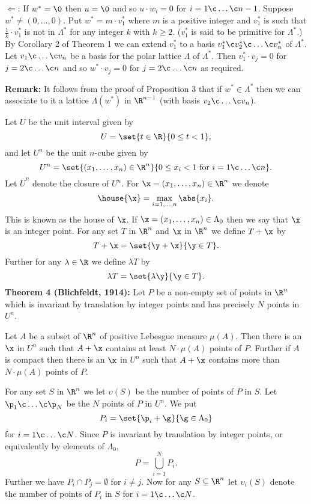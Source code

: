 $\Longleftarrow$: If $w^*=\0$ then $u=\0$ and so $u\cdot w_i=0$ for $i=1\c \dotsc\c n-1$.  Suppose $w^*\neq(0,\dotsc,0)$.  Put $w^*=m\cdot v^*_1$ where $m$ is a positive integer and $v^*_1$ is such that $\frac1k\cdot v^*_1$ is not in $\Lambda^*$ for any integer $k$ with $k\geq2$. ($v^*_1$ is said to be primitive for $\Lambda^*$.)  By Corollary 2 of Theorem 1 we can extend $v^*_1$ to a basis $v^*_1\c v^*_2\c \dotsc\c v^*_n$ of $\Lambda^*$.  Let $v_1\c \dotsc\c v_n$ be a basis for the polar lattice $\Lambda$ of $\Lambda^*$.  Then $v^*_1\cdot v_j=0$ for $j=2\c \dotsc\c n$ and so $w^*\cdot v_j=0$ for $j=2\c \dotsc\c n$ as required.

\textbf{Remark:} It follows from the proof of Proposition 3 that if $w^*\in\Lambda^*$ then we can associate to it a lattice $\Lambda(w^*)$ in $\R^{n-1}$ (with basis $v_2\c \dotsc\c v_n$).

Let $U$ be the unit interval given by
\[ U = \set{t\in\R}{0\leq t<1}, \]
and let $U^n$ be the unit $n$-cube given by
\[ U^n = \set{(x_1,\dotsc,x_n)\in\R^n}{0\leq x_i<1\text{ for }i=1\c \dotsc\c n} . \]
Let $\overline U^n$ denote the closure of $U^n$.  For $\x=(x_1,\dotsc,x_n)\in\R^n$ we denote
\[ \house{\x} = \max_{i=1,\dotsc,n}\abs{x_i} . \]
This is known as the house of $\x$.  If $\x=(x_1,\dotsc,x_n)\in\Lambda_0$ then we say that $\x$ is an integer point.  For any set $T$ in $\R^n$ and $\x$ in $\R^n$ we define $T+\x$ by
\[ T + \x = \set{\y+\x}{\y\in T} . \]
Further for any $\lambda\in\R$ we define $\lambda T$ by
\[ \lambda T = \set{\lambda\y}{\y\in T} . \]
\textbf{Theorem 4 (Blichfeldt, 1914):} Let $P$ be a non-empty set of points in $\R^n$ which is invariant by translation by integer points and has precisely $N$ points in $U^n$.

Let $A$ be a subset of $\R^n$ of positive Lebesgue measure $\mu(A)$.  Then there is an $\x$ in $U^n$ such that $A+\x$ contains at least $N\cdot\mu(A)$ points of $P$.  Further if $A$ is compact then there is an $\x$ in $U^n$ such that $A+\x$ contains more than $N\cdot\mu(A)$ points of $P$.

\pf For any set $S$ in $\R^n$ we let $\upsilon(S)$ be the number of points of $P$ in $S$.  Let $\p_1\c \dotsc\c \p_N$ be the $N$ points of $P$ in $U^n$.  We put
\[ P_i = \set{\p_i+\g}{\g\in\Lambda_0} \]
for $i=1\c \dotsc\c N$.  Since $P$ is invariant by translation by integer points, or equivalently by elements of $\Lambda_0$,
\[ P = \bigcup_{i=1}^N P_i . \]
Further we have $P_i\cap P_j=\emptyset$ for $i\neq j$.  Now for any $S\subseteq\R^n$ let $\upsilon_i(S)$ denote the number of points of $P_i$ in $S$ for $i=1\c \dotsc\c N$.

